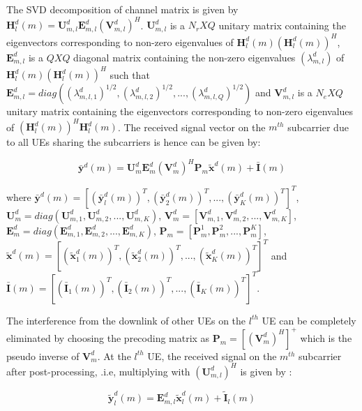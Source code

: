 \documentclass[conference]{IEEEtran}
\begin{document}
The SVD decomposition of channel matrix  is given by $\mathbf{H}^d_l (m)= \mathbf{U}^d_{m,l} \mathbf{E}_{m,l}^d (\mathbf{V}^d_{m,l})^H$. $\mathbf{U}^d_{m,l}$ is a $N_r X Q$ unitary matrix containing the eigenvectors corresponding to non-zero eigenvalues of $\mathbf{H}^d_l(m) (\mathbf{H}^d_l(m))^H$, $\mathbf{E}^d_{m,l}$  is a $Q X Q$ diagonal matrix containing the non-zero eigenvalues $(\lambda^d_{m,l})$ of $\mathbf{H}^d_l(m) (\mathbf{H}^d_l(m))^H$ such that $\mathbf{E}^d_{m,l}=diag((\lambda^d_{m,l,1})^{1/2},(\lambda^d_{m,l,2})^{1/2}, ...,(\lambda^d_{m,l,Q})^{1/2})$ and $\mathbf{V}^d_{m,l}$ is a $N_e X Q$  unitary matrix containing the eigenvectors corresponding to non-zero eigenvalues of $(\mathbf{H}^d_l(m))^H \mathbf{H}^d_l(m)$. The received signal vector on the $m^{th}$ subcarrier due to all UEs sharing the subcarriers is hence can be given by: 

                          \begin{equation}
       \label{nine}
      \mathbf{\bar{y}}^d (m) = \mathbf{U}^d_m \mathbf{E}^d_m (\mathbf{V}^d_m)^H \mathbf{P}_m \mathbf{\tilde{x}}^d(m) + \mathbf{\bar{I}} (m)
       \end{equation} 
       
where $\mathbf{\bar{y}}^d (m) =  [(\mathbf{\bar{y}}^d_l(m))^T,(\mathbf{\bar{y}}^d_2(m))^T,...,(\mathbf{\bar{y}}^d_K(m))^T]^T$, $\mathbf{U}^d_m= diag(\mathbf{U}^d_{m,1},\mathbf{U}^d_{m,2},...,\mathbf{U}^d_{m,K})$, $\mathbf{V}^d_m = [\mathbf{V}^d_{m,1},\mathbf{V}^d_{m,2},...,\mathbf{V}^d_{m,K}]$, $\mathbf{E}^d_m=diag(\mathbf{E}^d_{m,1}, \mathbf{E}^d_{m,2},...,\mathbf{E}^d_{m,K})$, $\mathbf{P}_m=[\mathbf{P}^1_m, \mathbf{P}^2_m,...,\mathbf{P}^K_m]$, $\mathbf{\tilde{x}}^d(m)=[(\mathbf{\tilde{x}}_1^d(m))^T, (\mathbf{\tilde{x}}_2^d(m))^T,...,(\mathbf{\tilde{x}}_K^d(m))^T]^T$ and $\mathbf{\bar{I}}(m)=[(\mathbf{\bar{I}}_1(m))^T,(\mathbf{\bar{I}}_2(m))^T,...,(\mathbf{\bar{I}}_K(m))^T]^T$. \par

The interference from the downlink of other UEs on the $l^{th}$ UE can be completely eliminated by choosing the precoding matrix as $\mathbf{P}_m=[(\mathbf{V}^d_m)^H]^+ $ which is the pseudo inverse of $\mathbf{V}^d_m$. At the $l^{th}$ UE, the received signal on the $m^{th}$ subcarrier after post-processing, .i.e, multiplying with $(\mathbf{U}^d_{m,l})^H$ is given by \cite{sc_fdma}: \vspace{-0.50em}
      
 \begin{equation}
       \label{ten}
             \mathbf{\tilde{y}}^d_{l} (m) = \mathbf{{E}}^d_{m,l} \mathbf{\tilde{x}}^d_{l} (m) + \mathbf{\tilde{I}}_{l}(m)
        \end{equation} 
       
\end{document}
